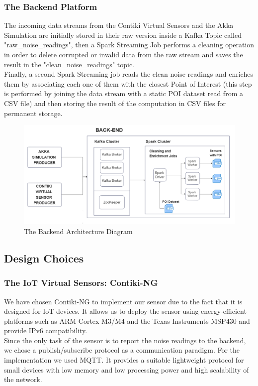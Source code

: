 \documentclass{article}
\begin{document}
\subsubsection{The Backend Platform}
The incoming data streams from the Contiki Virtual Sensors and the Akka Simulation are initially stored in their raw version inside a Kafka Topic called "raw\_noise\_readings", then a Spark Streaming Job performs a cleaning operation in order to delete corrupted or invalid data from the raw stream and saves the result in the "clean\_noise\_readings" topic. 
\\
Finally, a second Spark Streaming job reads the clean noise readings and enriches them by associating each one of them with the closest Point of Interest (this step is performed by joining the data stream with a static POI dataset read from a CSV file) and then storing the result of the computation in CSV files for permanent storage. 

\clearpage

\begin{figure}[htp]
    \centering
    \includegraphics[width=0.9\linewidth]{resources/project1_backend_diagram.png}
    \caption{The Backend Architecture Diagram}
\end{figure}

\subsection{Design Choices}
\subsubsection{The IoT Virtual Sensors: Contiki-NG}
We have chosen Contiki-NG to implement our sensor due to the fact that it is designed for IoT devices. It allows us to deploy the sensor using energy-efficient platforms such as ARM Cortex-M3/M4 and the Texas Instruments MSP430 and provide IPv6 compatibility. 
\\
Since the only task of the sensor is to report the noise readings to the backend, we chose a publish/subscribe protocol as a communication paradigm. For the implementation we used MQTT. It provides a suitable lightweight protocol for small devices with low memory and low processing power and high scalability of the network.
\end{document}
